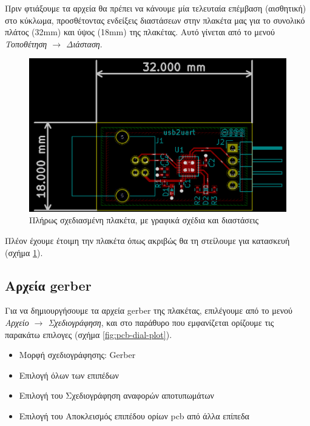 \documentclass[a4paper]{article}
\begin{document}
Πριν φτιάξουμε τα αρχεία θα πρέπει να κάνουμε μία τελευταία επέμβαση (αισθητική) στο κύκλωμα, προσθέτοντας ενδείξεις διαστάσεων στην πλακέτα μας για το συνολικό πλάτος (32mm) και ύψος (18mm) της πλακέτας. Αυτό γίνεται από το μενού \textit{Τοποθέτηση $\rightarrow$ Διάσταση}.

\begin{figure}
  \begin{center}
    \includegraphics[width=.9\textwidth]{img/pcb-circ-finaldrwn.png}
    \caption{Πλήρως σχεδιασμένη πλακέτα, με γραφικά σχέδια και διαστάσεις}
    \label{fig:pcb-circ-finaldrwn}
  \end{center}
\end{figure}

Πλέον έχουμε έτοιμη την πλακέτα όπως ακριβώς θα τη στείλουμε για κατασκευή (σχήμα \ref{fig:pcb-circ-finaldrwn}).

\subsection{Αρχεία gerber}
Για να δημιουργήσουμε τα αρχεία gerber της πλακέτας, επιλέγουμε από το μενού \textit{Αρχείο $\rightarrow$ Σχεδιογράφηση}, και στο παράθυρο που εμφανίζεται ορίζουμε τις παρακάτω επιλογες (σχήμα \ref{fig:pcb-dial-plot}).

\begin{itemize}
    \item Μορφή σχεδιογράφησης: Gerber
    \item Επιλογή όλων των επιπέδων
    \item Επιλογή του Σχεδιογράφηση αναφορών αποτυπωμάτων
    \item Επιλογή του Αποκλεισμός επιπέδου ορίων pcb από άλλα επίπεδα
\end{itemize}
\end{document}
